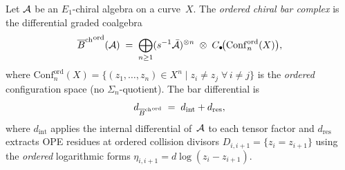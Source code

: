 \begin{definition}
Let $\mathcal{A}$ be an $E_1$-chiral algebra on a curve~$X$. The
\emph{ordered chiral bar complex} is the differential graded
coalgebra
\[
{\overline{B}^{\mathrm{ch}}}^{\mathrm{ord}}(\mathcal{A})
\;=\;
\bigoplus_{n\ge 1}
(s^{-1}\bar{\mathcal{A}})^{\otimes n}
\;\otimes\;
C_\bullet\!\bigl(\mathrm{Conf}_n^{\mathrm{ord}}(X)\bigr),
\]
where $\mathrm{Conf}_n^{\mathrm{ord}}(X)
=\{(z_1,\dots,z_n)\in X^n\mid z_i\neq z_j\;\forall\,i\neq j\}$
is the \emph{ordered} configuration space (no $\Sigma_n$-quotient).
The bar differential is
\[
d_{{\overline{B}^{\mathrm{ch}}}^{\mathrm{ord}}}
\;=\;
d_{\mathrm{int}}+d_{\mathrm{res}},
\]
where $d_{\mathrm{int}}$ applies the internal differential
of~$\mathcal{A}$ to each tensor factor and $d_{\mathrm{res}}$
extracts OPE residues at ordered collision divisors
$D_{i,i+1}=\{z_i=z_{i+1}\}$ using the \emph{ordered}
logarithmic forms $\eta_{i,i+1}=d\log(z_i-z_{i+1})$.

\end{definition}

